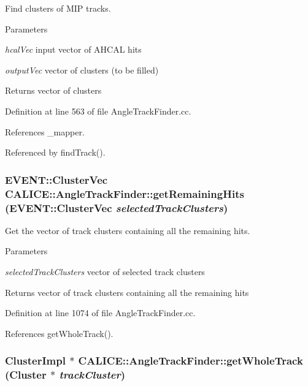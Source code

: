Find clusters of MIP tracks. 
\begin{DoxyParams}{Parameters}
\item[{\em hcalVec}]input vector of AHCAL hits \item[{\em outputVec}]vector of clusters (to be filled) \end{DoxyParams}
\begin{DoxyReturn}{Returns}
vector of clusters 
\end{DoxyReturn}


Definition at line 563 of file AngleTrackFinder.cc.

References \_\-mapper.

Referenced by findTrack().
\subsubsection[{getRemainingHits}]{\setlength{\rightskip}{0pt plus 5cm}EVENT::ClusterVec CALICE::AngleTrackFinder::getRemainingHits (EVENT::ClusterVec {\em selectedTrackClusters})\hspace{0.3cm}{\ttfamily  [private]}}\label{classCALICE_1_1AngleTrackFinder_ae0fd37e5b74a53bb65d845fec3e3528d}


Get the vector of track clusters containing all the remaining hits. 
\begin{DoxyParams}{Parameters}
\item[{\em selectedTrackClusters}]vector of selected track clusters \end{DoxyParams}
\begin{DoxyReturn}{Returns}
vector of track clusters containing all the remaining hits 
\end{DoxyReturn}


Definition at line 1074 of file AngleTrackFinder.cc.

References getWholeTrack().
\subsubsection[{getWholeTrack}]{\setlength{\rightskip}{0pt plus 5cm}ClusterImpl $\ast$ CALICE::AngleTrackFinder::getWholeTrack (Cluster $\ast$ {\em trackCluster})\hspace{0.3cm}{\ttfamily  [private]}}\label{classCALICE_1_1AngleTrackFinder_aa5e29dedb8b2b70a44e965bbc7de8a48}


